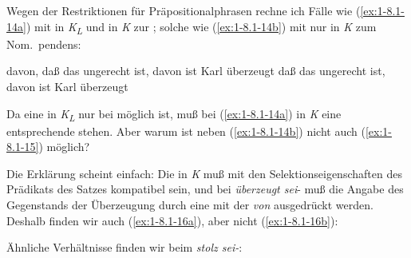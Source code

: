 \documentclass[output=paper]{langsci/langscibook}
\begin{document}
Wegen der Restriktionen für Präpositionalphrasen rechne ich Fälle wie (\ref{ex:1-8.1-14a}) mit
 in \textit{K\textsubscript{L}} und in \textit{K} zur ; solche wie (\ref{ex:1-8.1-14b}) mit  nur in \textit{K} zum Nom.\ pendens:
\begin{exe}
\ex\label{ex:1-8.1-14}
\begin{xlist}
\ex\label{ex:1-8.1-14a} davon, daß das ungerecht ist, davon ist Karl überzeugt
\ex\label{ex:1-8.1-14b} daß das ungerecht ist, davon ist Karl überzeugt
\end{xlist}
\end{exe}
Da eine  in \textit{K\textsubscript{L}} nur bei  möglich ist, muß bei
(\ref{ex:1-8.1-14a}) in \textit{K} eine entsprechende  stehen. Aber warum ist neben
(\ref{ex:1-8.1-14b}) nicht auch (\ref{ex:1-8.1-15}) möglich?
\begin{exe}
\end{exe}
Die Erklärung scheint einfach: Die  in \textit{K} muß mit den Selektionseigenschaften des Prädikats des Satzes kompatibel sein, und bei \textit{überzeugt\Hack{\break} sei}- muß die
Angabe des Gegenstands der Überzeugung durch eine  mit der
 \textit{von} ausgedrückt werden. Deshalb finden wir auch (\ref{ex:1-8.1-16a}), aber nicht (\ref{ex:1-8.1-16b}):
\begin{exe}
\ex\label{ex:1-8.1-16}
\begin{xlist}
\end{xlist}
\end{exe}
Ähnliche Verhältnisse finden wir beim  \textit{stolz sei-}:
\begin{exe}
\ex\label{ex:1-8.1-17}
\begin{xlist}
\end{xlist}
\ex
\label{ex:1-8.1-18}
\begin{xlist}
\end{xlist}
\end{exe}
\end{document}
